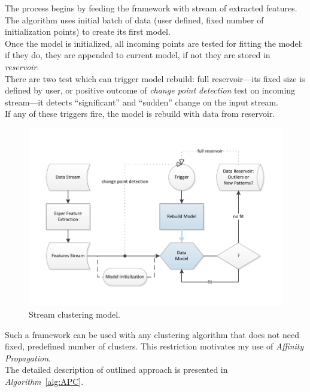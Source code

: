 \documentclass[11pt, letterpaper]{article}            %
\begin{document}
The process begins by feeding the framework with stream of extracted features. The algorithm uses initial batch of data (user defined, fixed number of initialization points) to create its first model.\\
Once the model is initialized, all incoming points are tested for fitting the model: if they do, they are appended to current model, if not they are stored in \emph{reservoir}.\\
There are two test which can trigger model rebuild: full reservoir---its fixed size is defined by user, or positive outcome of \emph{change point detection} test on incoming stream---it detects ``significant'' and ``sudden'' change on the input stream.\\
If any of these triggers fire, the model is rebuild with data from reservoir.\\

\begin{figure}[htbp]
    \centering
    \includegraphics[width=\textwidth]{./gfx/APC_Presentation.pdf}
  \caption{Stream clustering model.\label{fig:APC}}
\end{figure}

Such a framework can be used with any clustering algorithm that does not need fixed, predefined number of clusters. This restriction motivates my use of \emph{Affinity Propagation}.\\

\noindent The detailed description of outlined approach is presented in \emph{Algorithm}~\ref{alg:APC}.\\
\end{document}
